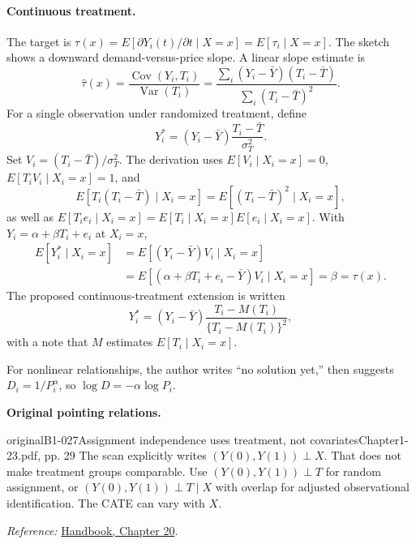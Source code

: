 {\paragraph{Continuous treatment.}
The target is $\tau(x)=E[\partial Y_i(t)/\partial t\mid X=x]=E[\tau_i\mid X=x]$. The sketch shows a downward demand-versus-price slope. A linear slope estimate is
\[\hat\tau(x)=\frac{\operatorname{Cov}(Y_i,T_i)}{\operatorname{Var}(T_i)}
=\frac{\sum_i(Y_i-\bar Y)(T_i-\bar T)}{\sum_i(T_i-\bar T)^2}.
\]
For a single observation under randomized treatment, define
\[Y_i^*=(Y_i-\bar Y)\frac{T_i-\bar T}{\sigma_T^2}.\]
Set $V_i=(T_i-\bar T)/\sigma_T^2$. The derivation uses $E[V_i\mid X_i=x]=0$, $E[T_iV_i\mid X_i=x]=1$, and
\[E[T_i(T_i-\bar T)\mid X_i=x]=E[(T_i-\bar T)^2\mid X_i=x],\]
as well as $E[T_ie_i\mid X_i=x]=E[T_i\mid X_i=x]E[e_i\mid X_i=x]$. With $Y_i=\alpha+\beta T_i+e_i$ at $X_i=x$,
\begin{align*}
E[Y_i^*\mid X_i=x]
&=E[(Y_i-\bar Y)V_i\mid X_i=x]\\
&=E[(\alpha+\beta T_i+e_i-\bar Y)V_i\mid X_i=x]=\beta=\tau(x).
\end{align*}
The proposed continuous-treatment extension is written
\[Y_i^*=(Y_i-\bar Y)\frac{T_i-M(T_i)}{\{T_i-M(T_i)\}^2},\]
with a note that $M$ estimates $E[T_i\mid X_i=x]$.  

For nonlinear relationships, the author writes ``no solution yet,'' then suggests $D_i=1/P_i^\alpha$, so $\log D=-\alpha\log P_i$.

\par{}\smallskip\textbf{Original pointing relations.}\par\smallskip
{}
\begin{reviewnote}{original}{B1-027}{Assignment independence uses treatment, not covariates}{Chapter1-23.pdf, pp. 29}
The scan explicitly writes $(Y(0),Y(1))\perp X$. That does not make treatment groups comparable. Use $(Y(0),Y(1))\perp T$ for random assignment, or $(Y(0),Y(1))\perp T\mid X$ with overlap for adjusted observational identification. The CATE can vary with $X$.
\par\smallskip\textit{Reference:} \href{https://matheusfacure.github.io/python-causality-handbook/20-Plug-and-Play-Estimators.html}{Handbook, Chapter 20}.
\end{reviewnote}

}
